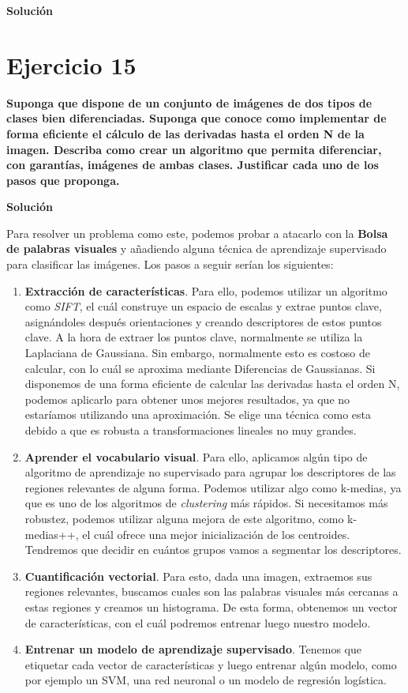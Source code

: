 \documentclass[11pt,a4paper]{article}
\newcommand{\answer}{\noindent\textbf{Solución}}
\newcommand{\question}[1]{\noindent\textbf{#1}}
\newcommand{\nonumbersection}[1]{\section*{#1}\addcontentsline{toc}{section}{#1}}
\begin{document}
\answer

\nonumbersection{Ejercicio 15}

\question{Suponga que dispone de un conjunto de imágenes de dos tipos de
clases bien diferenciadas. Suponga que conoce como implementar de forma
eficiente el cálculo de las derivadas hasta el orden N de la imagen.
Describa como crear un algoritmo que permita diferenciar, con garantías,
imágenes de ambas clases. Justificar cada uno de los pasos que proponga.}

\answer

Para resolver un problema como este, podemos probar a atacarlo con la \textbf{Bolsa de palabras visuales} y añadiendo alguna
técnica de aprendizaje supervisado para clasificar las imágenes. Los pasos a seguir serían los siguientes:

\begin{enumerate}
	\item \textbf{Extracción de características}. Para ello, podemos utilizar un algoritmo como \textit{SIFT}, el cuál
	construye un espacio de escalas y extrae puntos clave, asignándoles después orientaciones y creando descriptores
	de estos puntos clave. A la hora de extraer los puntos clave, normalmente se utiliza la Laplaciana de Gaussiana.
	Sin embargo, normalmente esto es costoso de calcular, con lo cuál se aproxima mediante Diferencias de Gaussianas.
	Si disponemos de una forma eficiente de calcular las derivadas hasta el orden N, podemos aplicarlo para obtener unos
	mejores resultados, ya que no estaríamos utilizando una aproximación. Se elige una técnica como esta debido a que
	es robusta a transformaciones lineales no muy grandes.
	\item \textbf{Aprender el vocabulario visual}. Para ello, aplicamos algún tipo de algoritmo de aprendizaje no supervisado
	para agrupar los descriptores de las regiones relevantes de alguna forma. Podemos utilizar algo como k-medias, ya que
	es uno de los algoritmos de \textit{clustering} más rápidos. Si necesitamos más robustez, podemos utilizar alguna mejora
	de este algoritmo, como k-medias++, el cuál ofrece una mejor inicialización de los centroides. Tendremos que decidir
	en cuántos grupos vamos a segmentar los descriptores.
	\item \textbf{Cuantificación vectorial}. Para esto, dada una imagen, extraemos sus regiones relevantes, buscamos
	cuales son las palabras visuales más cercanas a estas regiones y creamos un histograma. De esta forma, obtenemos
	un vector de características, con el cuál podremos entrenar luego nuestro modelo.
	\item \textbf{Entrenar un modelo de aprendizaje supervisado}. Tenemos que etiquetar cada vector de características
	y luego entrenar algún modelo, como por ejemplo un SVM, una red neuronal o un modelo de regresión logística.
\end{enumerate}
\end{document}
